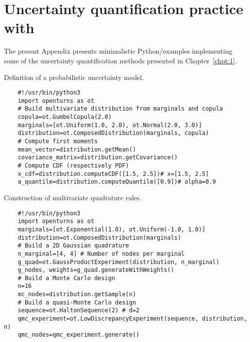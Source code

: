 \cleardoublepage
\chapter{Uncertainty quantification practice with \ot}
\label{apx:D}

The present Appendix presents minimalistic Python/\ots examples implementing some of the uncertainty quantification methods presented in Chapter~\ref{chpt:1}.

\begin{otexample_apx}
    Definition of a probabilistic uncertainty model. 
    \lstset{style=mystyle, language=python}
%
\begin{lstlisting}
    #!/usr/bin/python3
    import openturns as ot
    # Build multivariate distribution from marginals and copula
    copula=ot.GumbelCopula(2.0)
    marginals=[ot.Uniform(1.0, 2.0), ot.Normal(2.0, 3.0)]
    distribution=ot.ComposedDistribution(marginals, copula)
    # Compute first moments
    mean_vector=distribution.getMean()
    covariance_matrix=distribution.getCovariance()
    # Compute CDF (respectively PDF)
    x_cdf=distribution.computeCDF([1.5, 2.5])# x=[1.5, 2.5]
    a_quantile=distribution.computeQuantile([0.9])# alpha=0.9
\end{lstlisting}
%
\end{otexample_apx}

\begin{otexample_apx}
    Construction of multivariate quadrature rules.
%
\lstset{style=mystyle, language=python}
\begin{lstlisting}
    #!/usr/bin/python3
    import openturns as ot
    marginals=[ot.Exponential(1.0), ot.Uniform(-1.0, 1.0)]
    distribution=ot.ComposedDistribution(marginals)
    # Build a 2D Gaussian quadrature
    n_marginal=[4, 4] # Number of nodes per marginal
    g_quad=ot.GaussProductExperiment(distribution, n_marginal)
    g_nodes, weights=g_quad.generateWithWeights()
    # Build a Monte Carlo design
    n=16 
    mc_nodes=distribution.getSample(n)
    # Build a quasi-Monte Carlo design
    sequence=ot.HaltonSequence(2) # d=2
    qmc_experiment=ot.LowDiscrepancyExperiment(sequence, distribution, n)
    qmc_nodes=qmc_experiment.generate()
\end{lstlisting}
%
\end{otexample_apx}



